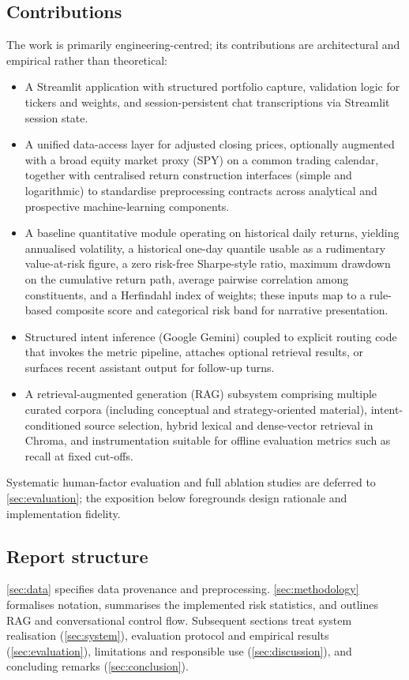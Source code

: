\subsection{Contributions}
The work is primarily engineering-centred; its contributions are architectural and empirical rather than theoretical:
\begin{itemize}
    \item A Streamlit application with structured portfolio capture, validation logic for tickers and weights, and session-persistent chat transcriptions via Streamlit session state.
    \item A unified data-access layer for adjusted closing prices, optionally augmented with a broad equity market proxy (SPY) on a common trading calendar, together with centralised return construction interfaces (simple and logarithmic) to standardise preprocessing contracts across analytical and prospective machine-learning components.
    \item A baseline quantitative module operating on historical daily returns, yielding annualised volatility, a historical one-day quantile usable as a rudimentary value-at-risk figure, a zero risk-free Sharpe-style ratio, maximum drawdown on the cumulative return path, average pairwise correlation among constituents, and a Herfindahl index of weights; these inputs map to a rule-based composite score and categorical risk band for narrative presentation.
    \item Structured intent inference (Google Gemini) coupled to explicit routing code that invokes the metric pipeline, attaches optional retrieval results, or surfaces recent assistant output for follow-up turns.
    \item A retrieval-augmented generation (RAG) subsystem comprising multiple curated corpora (including conceptual and strategy-oriented material), intent-conditioned source selection, hybrid lexical and dense-vector retrieval in Chroma, and instrumentation suitable for offline evaluation metrics such as recall at fixed cut-offs.
\end{itemize}
Systematic human-factor evaluation and full ablation studies are deferred to \autoref{sec:evaluation}; the exposition below foregrounds design rationale and implementation fidelity.

\subsection{Report structure}
\autoref{sec:data} specifies data provenance and preprocessing. \autoref{sec:methodology} formalises notation, summarises the implemented risk statistics, and outlines RAG and conversational control flow. Subsequent sections treat system realisation (\autoref{sec:system}), evaluation protocol and empirical results (\autoref{sec:evaluation}), limitations and responsible use (\autoref{sec:discussion}), and concluding remarks (\autoref{sec:conclusion}).
